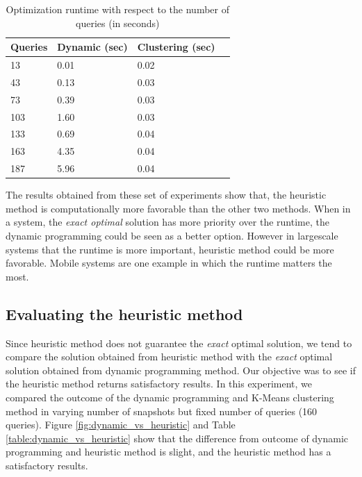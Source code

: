 			\begin {center}
			\begin{table}
				\centering
				\caption{Optimization runtime with respect to the number of queries (in seconds)}
				\label {table:variable_queries_2}
				\begin{tabular}{p{2cm}p{3cm}p{3cm}p{3cm}}
					\hline
					Queries  & Dynamic (sec) & Clustering (sec) \\ \hline
					13 & 0.01  & 0.02  \\  
					43 & 0.13  & 0.03  \\
					73 & 0.39  & 0.03  \\
					103 & 1.60  & 0.03  \\
					133 & 0.69  & 0.04 \\
					163 & 4.35  & 0.04  \\
					187 & 5.96  & 0.04  \\\hline
				\end{tabular}
			\end{table}
			\end{center}

			The results obtained from these set of experiments show that, the heuristic method is computationally more favorable than the other two methods. When in a system, the {\it{exact optimal}} solution has more priority over the runtime, the dynamic programming could be seen as a better option. However in largescale systems that the runtime is more important, heuristic method could be more favorable. Mobile systems are one example in which the runtime matters the most. 

			\subsection{Evaluating the heuristic method} \label{sec:evaluating_heuristic}
			Since heuristic method does not guarantee the {\it exact} optimal solution, we tend to compare the solution obtained from heuristic method with the {\it exact} optimal solution obtained from dynamic programming method. Our objective was to see if the heuristic method returns satisfactory results. 
			In this experiment, we compared the outcome of the dynamic programming and K-Means clustering method in varying number of snapshots but fixed number of queries (160 queries). Figure \ref{fig:dynamic_vs_heuristic} and Table \ref{table:dynamic_vs_heuristic} show that the 
			difference from outcome of dynamic programming and heuristic method is slight, and the heuristic method has a satisfactory results.

